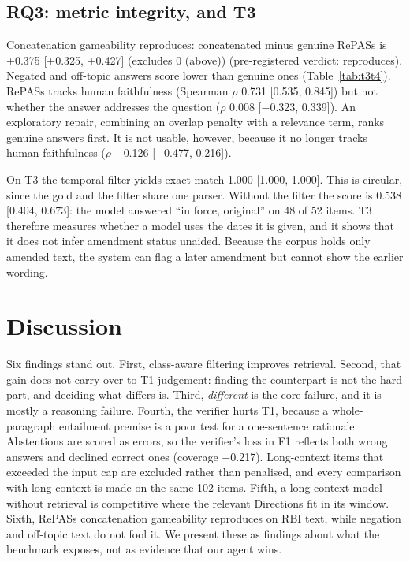 \documentclass[conference]{IEEEtran}
\begin{document}


\subsection{RQ3: metric integrity, and T3}
Concatenation gameability reproduces: concatenated minus genuine RePASs is
+0.375 [+0.325, +0.427] (excludes 0 (above)) (pre-registered verdict:
reproduces). Negated and off-topic answers score lower than genuine ones (Table~\ref{tab:t3t4}).
RePASs tracks human faithfulness (Spearman $\rho$ 0.731 [0.535, 0.845]) but not
whether the answer addresses the question ($\rho$ 0.008 [$-$0.323, 0.339]).
An exploratory repair, combining an overlap penalty with a relevance term, ranks genuine answers first. It is not usable, however,
because it no longer tracks human faithfulness ($\rho$ $-$0.126 [$-$0.477, 0.216]).

On T3 the temporal filter yields exact match 1.000 [1.000, 1.000]. This is circular, since the gold and the
filter share one parser. Without the filter the score is 0.538 [0.404, 0.673]: the model answered ``in force, original'' on
48 of 52 items. T3 therefore measures whether a model uses
the dates it is given, and it shows that it does not infer amendment status unaided. Because the corpus holds only amended text,
the system can flag a later amendment but cannot show the earlier wording.



\section{Discussion}\label{sec:discussion}
Six findings stand out. First, class-aware filtering improves retrieval. Second, that gain does not carry over to T1 judgement:
finding the counterpart is not the hard part, and deciding what differs is. Third, \textit{different} is the core failure, and it is
mostly a reasoning failure. Fourth, the verifier hurts T1, because a whole-paragraph entailment premise is a poor test for a
one-sentence rationale. Abstentions are scored as errors, so the verifier's loss in F1 reflects both wrong answers and declined
correct ones (coverage $-$0.217). Long-context items
that exceeded the input cap are excluded rather than penalised, and every comparison with long-context is made on the same
102 items. Fifth, a long-context model without retrieval is competitive where the relevant Directions fit in its window.
Sixth, RePASs concatenation gameability reproduces on RBI text, while negation and off-topic text do not fool it. We present these as
findings about what the benchmark exposes, not as evidence that our agent wins.
\end{document}
